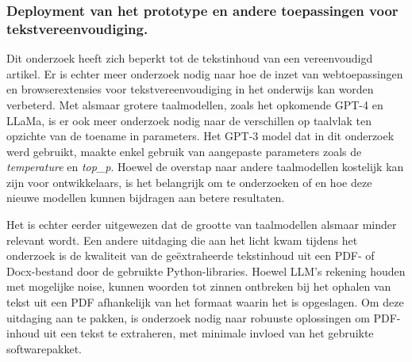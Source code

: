 \subsubsection{Deployment van het prototype en andere toepassingen voor tekstvereenvoudiging.}

Dit onderzoek heeft zich beperkt tot de tekstinhoud van een vereenvoudigd artikel. Er is echter meer onderzoek nodig naar hoe de inzet van webtoepassingen en browserextensies voor tekstvereenvoudiging in het onderwijs kan worden verbeterd. Met alsmaar grotere taalmodellen, zoals het opkomende GPT-4 en LLaMa, is er ook meer onderzoek nodig naar de verschillen op taalvlak ten opzichte van de toename in parameters. Het GPT-3 model dat in dit onderzoek werd gebruikt, maakte enkel gebruik van aangepaste parameters zoals de \textit{temperature} en \textit{top\_p}. Hoewel de overstap naar andere taalmodellen kostelijk kan zijn voor ontwikkelaars, is het belangrijk om te onderzoeken of en hoe deze nieuwe modellen kunnen bijdragen aan betere resultaten. 

\medskip

Het is echter eerder uitgewezen dat de grootte van taalmodellen alsmaar minder relevant wordt. Een andere uitdaging die aan het licht kwam tijdens het onderzoek is de kwaliteit van de geëxtraheerde tekstinhoud uit een PDF- of Docx-bestand door de gebruikte Python-libraries. Hoewel LLM's rekening houden met mogelijke noise, kunnen woorden tot zinnen ontbreken bij het ophalen van tekst uit een PDF afhankelijk van het formaat waarin het is opgeslagen. Om deze uitdaging aan te pakken, is onderzoek nodig naar robuuste oplossingen om PDF-inhoud uit een tekst te extraheren, met minimale invloed van het gebruikte softwarepakket.